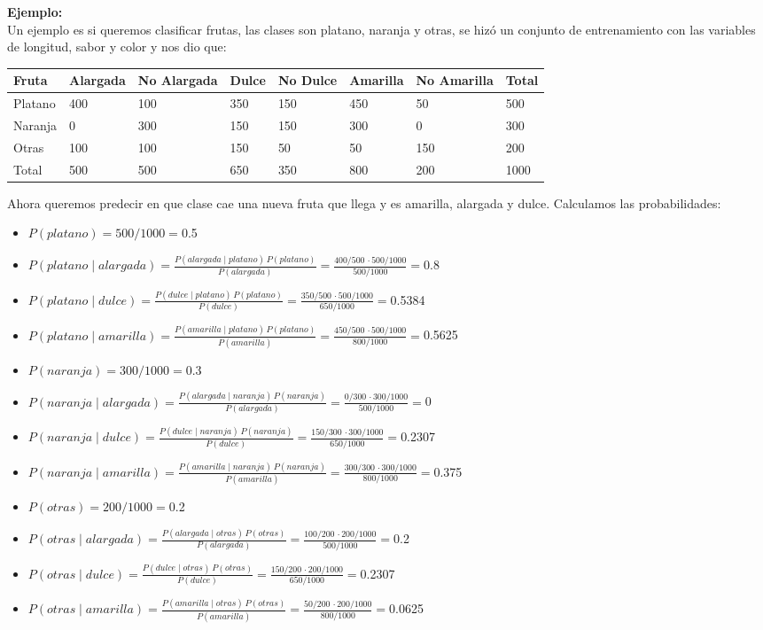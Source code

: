 \documentclass{article}
\begin{document}
{\bf Ejemplo:}\\
 Un ejemplo es si queremos clasificar frutas, las clases son platano, naranja y otras, se hizó un conjunto de entrenamiento con las variables
 de longitud, sabor y color y nos dio que:
 \begin{center}
  \begin{tabular}{|l||l|l||l|l||l|l||l|}
   \hline
   Fruta & Alargada & No Alargada & Dulce & No Dulce & Amarilla & No Amarilla & Total \\ \hline \hline
   Platano & 400 & 100 & 350 & 150 & 450 & 50 & 500 \\ \hline
   Naranja & 0 & 300 & 150 & 150 & 300 & 0 & 300 \\ \hline
   Otras & 100 & 100 & 150 & 50 & 50 & 150 & 200 \\ \hline \hline
   Total & 500 & 500 & 650 & 350 & 800 & 200 & 1000 \\ \hline
  \end{tabular}
  \end{center}
  Ahora queremos predecir en que clase cae una nueva fruta que llega y es amarilla, alargada y dulce.
  Calculamos las probabilidades:
  \begin{itemize}
   \item $ P(platano) = 500/1000 = $0.5
   \item $ P(platano \mid alargada) = \frac{P(alargada \mid platano) \, P(platano)}{P(alargada)} = \frac{400/500 \, \cdot 500/1000}{500/1000} = $0.8
   \item $ P(platano \mid dulce) = \frac{P(dulce \mid platano) \, P(platano)}{P(dulce)} = \frac{350/500 \, \cdot 500/1000}{650/1000} = $0.5384
   \item $ P(platano \mid amarilla) = \frac{P(amarilla \mid platano) \, P(platano)}{P(amarilla)} = \frac{450/500 \, \cdot 500/1000}{800/1000} = $0.5625
   \item $ P(naranja) = 300/1000 = $0.3
   \item $ P(naranja \mid alargada) = \frac{P(alargada \mid naranja) \, P(naranja)}{P(alargada)} = \frac{0/300 \, \cdot 300/1000}{500/1000} = $0
   \item $ P(naranja \mid dulce) = \frac{P(dulce \mid naranja) \, P(naranja)}{P(dulce)} = \frac{150/300 \, \cdot 300/1000}{650/1000} = $0.2307
   \item $ P(naranja \mid amarilla) = \frac{P(amarilla \mid naranja) \, P(naranja)}{P(amarilla)} = \frac{300/300 \, \cdot 300/1000}{800/1000} = $0.375
   \item $ P(otras) = 200/1000 = $0.2
   \item $ P(otras \mid alargada) = \frac{P(alargada \mid otras) \, P(otras)}{P(alargada)} = \frac{100/200 \, \cdot 200/1000}{500/1000} = $0.2
   \item $ P(otras \mid dulce) = \frac{P(dulce \mid otras) \, P(otras)}{P(dulce)} = \frac{150/200 \, \cdot 200/1000}{650/1000} = $0.2307
   \item $ P(otras \mid amarilla) = \frac{P(amarilla \mid otras) \, P(otras)}{P(amarilla)} = \frac{50/200 \, \cdot 200/1000}{800/1000} = $0.0625
  \end{itemize}
\end{document}
